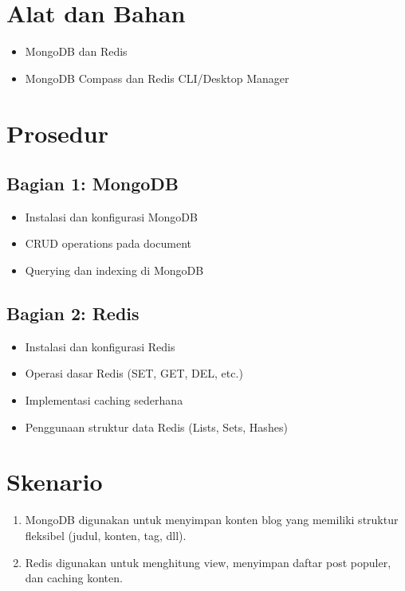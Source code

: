 \section{Alat dan Bahan}
\begin{itemize}
    \item MongoDB dan Redis
    \item MongoDB Compass dan Redis CLI/Desktop Manager
\end{itemize}

\section{Prosedur}

\subsection{Bagian 1: MongoDB}
\begin{itemize}
    \item Instalasi dan konfigurasi MongoDB
    \item CRUD operations pada document
    \item Querying dan indexing di MongoDB
\end{itemize}

\subsection{Bagian 2: Redis}
\begin{itemize}
    \item Instalasi dan konfigurasi Redis
    \item Operasi dasar Redis (SET, GET, DEL, etc.)
    \item Implementasi caching sederhana
    \item Penggunaan struktur data Redis (Lists, Sets, Hashes)
\end{itemize}

\section{Skenario}
\begin{enumerate}
    \item MongoDB digunakan untuk menyimpan konten blog yang memiliki struktur fleksibel (judul, konten, tag, dll).
    \item Redis digunakan untuk menghitung view, menyimpan daftar post populer, dan caching konten.
\end{enumerate}

